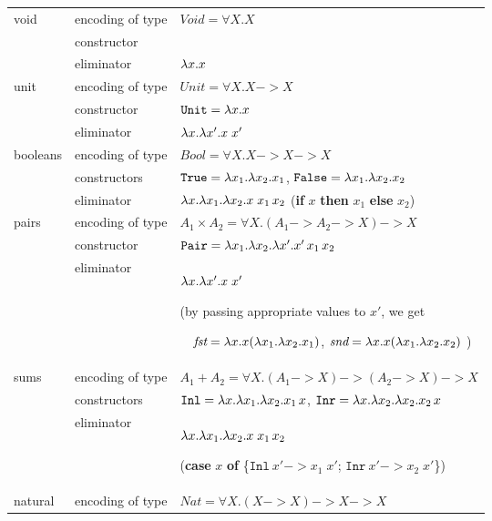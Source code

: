 \begin{table}
\begin{tabular}{p{15mm}|lp{92mm}}
        \hline
void
& encoding of type      & $\textit{Void} = \forall X.X$ \\
& constructor           & \\
& eliminator            & $\lambda x.x$
        \\\hline
unit
& encoding of type      & $\textit{Unit} = \forall X.X -> X$    \\
& constructor           & $\mathtt{Unit} = \lambda x.x$ \\
& eliminator            & $\lambda x.\lambda x'.x\;x'$
        \\\hline
booleans
& encoding of type      & $\textit{Bool} = \forall X.X -> X -> X$ \\
& constructors          & $\mathtt{True} = \lambda x_1.\lambda x_2. x_1$,\quad
                        $\mathtt{False} = \lambda x_1.\lambda x_2. x_2$ \\
& eliminator            & $\lambda x.\lambda x_1. \lambda x_2. x\;x_1\,x_2$ \qquad
                        (\textbf{if} $x$ \textbf{then} $x_1$ \textbf{else} $x_2$)
        \\\hline
pairs
& encoding of type      & $ A_1\times A_2 = \forall X. (A_1 -> A_2 -> X) -> X$ \\
& constructor           & $\mathtt{Pair} = \lambda x_1.\lambda x_2.\lambda x'.x'\,x_1\,x_2$ \\
& eliminator            & $\lambda x.\lambda x'.x\;x'$ \par
                        (by passing appropriate values to $x'$, we get\par
                        ~~$\textit{fst} = \lambda x.x(\lambda x_1.\lambda x_2.x_1)$,
                        $\textit{snd} = \lambda x.x(\lambda x_1.\lambda x_2.x_2)$ )
        \\\hline
sums
& encoding of type      & $A_1+A_2 = \forall X. (A_1 -> X) -> (A_2 -> X) -> X$ \\
& constructors          & $\mathtt{Inl} = \lambda x. \lambda x_1. \lambda x_2 . x_1\,x$,\quad
                        $\mathtt{Inr} = \lambda x. \lambda x_2. \lambda x_2 . x_2\,x$ \\
& eliminator            & $\lambda x.\lambda x_1. \lambda x_2. x\;x_1\,x_2$ \par
                        (\textbf{case} $x$ \textbf{of}
                                \{$\mathtt{Inl}~x' -> x_1\;x'$;
                                  $\mathtt{Inr}~x' -> x_2\;x'$\})
        \\\hline
natural
& encoding of type      & $\textit{Nat} = \forall X. (X -> X) -> X -> X$ \\

\end{tabular}
\end{table}
